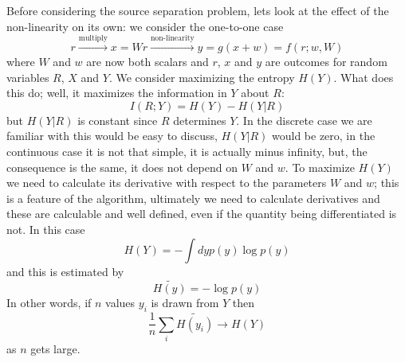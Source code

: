 \documentclass[12pt]{article}
\begin{document}
Before considering the source separation problem, lets look at the
effect of the non-linearity on its own: we consider the one-to-one
case
\begin{equation}
r\stackrel{\mbox{multiply}}{\longrightarrow}x=Wr\stackrel{\mbox{non-linearity}}{\longrightarrow}y=g(x+w)=f(r;w,W)
\end{equation}
where $W$ and $w$ are now both scalars and $r$, $x$ and $y$ are
outcomes for random variables $R$, $X$ and $Y$. We consider maximizing
the entropy $H(Y)$. What does this do; well, it maximizes the information in $Y$ about $R$:
\begin{equation}
I(R;Y)=H(Y)-H(Y|R)
\end{equation}
but $H(Y|R)$ is constant since $R$ determines $Y$. In the discrete
case we are familiar with this would be easy to discuss, $H(Y|R)$
would be zero, in the continuous case it is not that simple, it is
actually minus infinity, but, the consequence is the same, it does not
depend on $W$ and $w$. To maximize $H(Y)$ we need to calculate its
derivative with respect to the parameters $W$ and $w$; this is a
feature of the algorithm, ultimately we need to calculate derivatives
and these are calculable and well defined, even if the quantity being
differentiated is not. In this case
\begin{equation}
H(Y)=-\int dy p(y)\log{p(y)}
\end{equation}
and this is estimated by
\begin{equation}
\tilde{H(y)}=-\log{p(y)}
\end{equation}
In other words, if $n$ values $y_i$ is drawn from $Y$ then 
\begin{equation}
\frac{1}{n}\sum_i\tilde{H(y_i)}\rightarrow H(Y)
\end{equation}
as $n$ gets large. 
\end{document}
